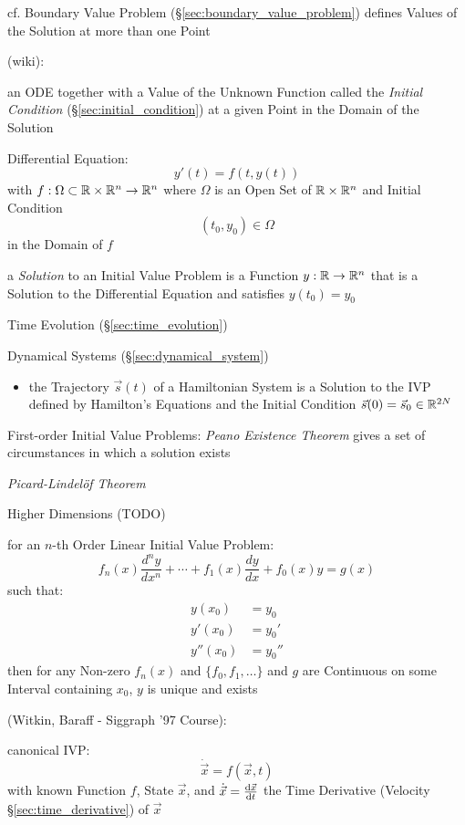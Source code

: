 \fist cf. Boundary Value Problem (\S\ref{sec:boundary_value_problem}) defines
Values of the Solution at more than one Point

(wiki):

an ODE together with a Value of the Unknown Function called the \emph{Initial
  Condition} (\S\ref{sec:initial_condition}) at a given Point in the Domain of
the Solution

Differential Equation:
\[
  y'(t) = f(t, y(t))
\]
with $f : \Omega \subset \mathbb{R} \times \mathbb{R}^n \rightarrow \mathbb{R}^n$ where
$\Omega$ is an Open Set of $\mathbb{R} \times \mathbb{R}^n$ and Initial Condition
\[
  (t_0, y_0) \in \Omega
\]
in the Domain of $f$

a \emph{Solution} to an Initial Value Problem is a Function $y : \mathbb{R}
\rightarrow \mathbb{R}^n$ that is a Solution to the Differential Equation and
satisfies $y(t_0) = y_0$

\fist Time Evolution (\S\ref{sec:time_evolution})

\fist Dynamical Systems (\S\ref{sec:dynamical_system})

\begin{itemize}
  \item the Trajectory $\vec{s}(t)$ of a Hamiltonian System is a Solution to
    the IVP defined by Hamilton's Equations and the Initial Condition
    $\vec{s}(0) = \vec{s}_0 \in \mathbb{R}^{2N}$
\end{itemize}

First-order Initial Value Problems: \emph{Peano Existence Theorem} gives a set
of circumstances in which a solution exists

\emph{Picard-Lindel\"of Theorem}

Higher Dimensions (TODO)

for an $n$-th Order Linear Initial Value Problem:
\[
  f_n(x)\frac{d^ny}{dx^n} + \cdots + f_1(x)\frac{dy}{dx} + f_0(x)y = g(x)
\]
such that:
\begin{align*}
  y(x_0)   & = y_0   \\
  y'(x_0)  & = y_0'  \\
  y''(x_0) & = y_0''
\end{align*}
then for any Non-zero $f_n(x)$ and $\{f_0,f_1,\ldots\}$ and $g$ are Continuous
on some Interval containing $x_0$, $y$ is unique and exists

(Witkin, Baraff - Siggraph '97 Course):

canonical IVP:
\[
  \dot{\vec{x}} = f(\vec{x}, t)
\]
with known Function $f$, State $\vec{x}$, and $\dot{\vec{x}} =
\frac{\mathrm{d}\vec{x}}{\mathrm{d}t}$ the Time Derivative (Velocity \S\ref{sec:time_derivative})
of $\vec{x}$

